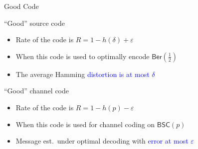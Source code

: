 \documentclass[10pt]{beamer}
\begin{document}
\begin{frame}{Good Code}
  \begin{block}{``Good'' source code}
    \begin{itemize}
    \item Rate of the code is $R=1-h(\delta)+\varepsilon$
    \item When this code is used to \alert{optimally encode} $\mathsf{Ber}(\tfrac{1}{2})$
    \item The average Hamming \textcolor{blue}{distortion is at most $\delta$}
    \end{itemize}
  \end{block}
  \vspace{0.4cm}
  \begin{block}{``Good'' channel code}
    \begin{itemize}
    \item Rate of the code is $R=1-h(p)-\varepsilon$
    \item When this code is used for channel coding on $\mathsf{BSC}(p)$
    \item Message est.~under \alert{optimal decoding} with \textcolor{blue}{error at most $\varepsilon$}
    \end{itemize}
  \end{block}
\end{frame}
\end{document}
